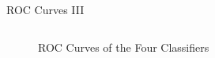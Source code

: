 \begin{frame}{ROC Curves III}
\begin{columns}[onlytextwidth]
\begin{column}{0.45\textwidth}
\begin{figure}
		\caption{ROC Curves of the Four Classifiers}
		\label{fig:ROCGaussian}
	\end{figure}
\end{column}
\end{columns}
\end{frame}
